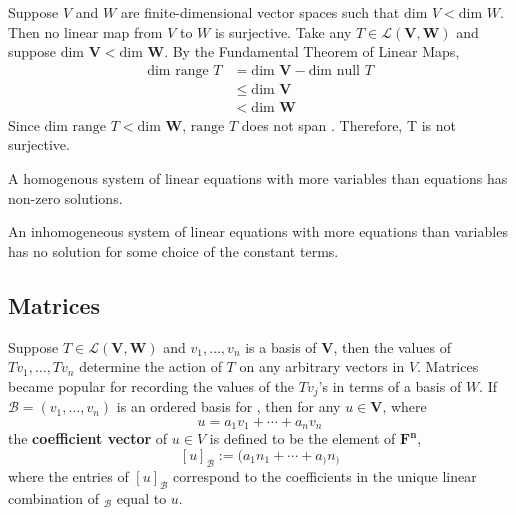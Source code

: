 \documentclass[11pt]{article} %
\newcommand\F[1]{\text{$\mathbf{F^{#1}}$}}
\newcommand\V{\text{$\mathbf{V}$}}
\newcommand\W{\text{$\mathbf{W}$}}
\newcommand\0{\text{$\mathbf{0}$}}
\renewcommand\L[2]{\mathcal{L}(#1,#2)}
\newcommand\lc[3]{#1_1 #2_1 + \cdots + #1_{#3} #2_{#3}}
\newcommand\ls[2]{#1_1, \ldots, #1_{#2}}
\renewcommand\dim{\text{dim }}
\renewcommand\null{\text{null }}
\newcommand\range{\text{range }}
\begin{document}
{Suppose $V$ and $W$ are finite-dimensional vector spaces such that $\dim V < \dim W$. Then no linear map from $V$ to $W$ is surjective.}
{
Take any $T \in \L{\V}{\W}$ and suppose $\dim \V < \dim \W$. By the Fundamental Theorem of Linear Maps,
\begin{align*}
\dim \range T &= \dim \V - \dim \null T \\
&\le \dim \V \\
&< \dim \W
\end{align*}
Since $\dim \range T < \dim \W$, $\range T$ does not span \W. Therefore, T is not surjective.
}

{A homogenous system of linear equations with more variables than equations has non-zero solutions.}
{}

{An inhomogeneous system of linear equations with more equations than variables has no solution for some choice of the constant terms.}
{}

\newpage

\subsection{Matrices}

Suppose $T \in \L{\V}{\W}$ and $\ls vn$ is a basis of $\V$, then the values of $\ls {Tv}{n}$ determine the action of $T$ on any arbitrary vectors in $V$. Matrices became popular for recording the values of the $Tv_j$'s in terms of a basis of $W$.
{
If $\mathcal{B} = (\ls vn)$ is an ordered basis for \V, then for any $u \in \V$, where
$$
u = \lc avn
$$
the \textbf{coefficient vector} of $u \in V$ is defined to be the element of $\F{n}$,
$$
[u]_\mathcal{B} := (\lc an)
$$
where the entries of $[u]_\mathcal{B}$ correspond to the coefficients in the unique linear combination of $_\mathcal{B}$ equal to $u$.
}
\end{document}
